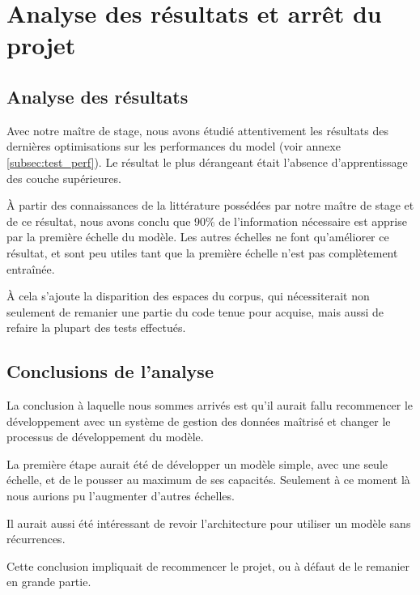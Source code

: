 \section{Analyse des résultats et arrêt du projet}\label{white_flag}



\subsection{Analyse des résultats}
Avec notre maître de stage, nous avons étudié attentivement les résultats des dernières optimisations sur les performances du \gls{model} (voir annexe \ref{subsec:test_perf}). 
Le résultat le plus dérangeant était l'absence d'apprentissage des couche supérieures.

À partir des connaissances de la littérature possédées par notre maître de stage et de ce résultat, nous avons conclu que 90\% de l'information nécessaire est apprise par la première échelle du modèle. Les autres échelles ne font qu'améliorer ce résultat, et sont peu utiles tant que la première échelle n'est pas complètement entraînée.

À cela s'ajoute la disparition des espaces du corpus, qui nécessiterait non seulement de remanier une partie du code tenue pour acquise, mais aussi de refaire la plupart des tests effectués.

\subsection{Conclusions de l'analyse}
La conclusion à laquelle nous sommes arrivés est qu'il aurait fallu recommencer le développement avec un système de gestion des données maîtrisé et changer le processus de développement du modèle.

La première étape aurait été de développer un modèle simple, avec une seule échelle, et de le pousser au maximum de ses capacités. Seulement à ce moment là nous aurions pu l'augmenter d'autres échelles.

Il aurait aussi été intéressant de revoir l'architecture pour utiliser un modèle sans récurrences.

Cette conclusion impliquait de recommencer le projet, ou à défaut de le remanier en grande partie.

